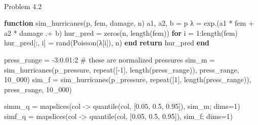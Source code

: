 \documentclass[
  letterpaper,
  DIV=11,
  numbers=noendperiod]{scrartcl}
\makeatletter
\let\oldparagraph\paragraph
\renewcommand{\paragraph}{
    \@ifstar
      \xxxParagraphStar
      \xxxParagraphNoStar
  }
\newcommand{\xxxParagraphStar}[1]{\oldparagraph*{#1}\mbox{}}
\newcommand{\xxxParagraphNoStar}[1]{\oldparagraph{#1}\mbox{}}
\newenvironment{Shaded}{\begin{snugshade}}{\end{snugshade}}
\newcommand{\CommentTok}[1]{\textcolor[rgb]{0.37,0.37,0.37}{#1}}
\newcommand{\ControlFlowTok}[1]{\textcolor[rgb]{0.00,0.23,0.31}{\textbf{#1}}}
\newcommand{\FloatTok}[1]{\textcolor[rgb]{0.68,0.00,0.00}{#1}}
\newcommand{\FunctionTok}[1]{\textcolor[rgb]{0.28,0.35,0.67}{#1}}
\newcommand{\KeywordTok}[1]{\textcolor[rgb]{0.00,0.23,0.31}{\textbf{#1}}}
\newcommand{\NormalTok}[1]{\textcolor[rgb]{0.00,0.23,0.31}{#1}}
\newcommand{\OperatorTok}[1]{\textcolor[rgb]{0.37,0.37,0.37}{#1}}
\newcommand*\circled[1]{\tikz[baseline=(char.base)]{
          \node[shape=circle,draw,inner sep=1pt] (char) {{\scriptsize#1}};}}
\makeatother
\begin{document}
\paragraph{Problem 4.2}\label{problem-4.2}

\label{annotated-cell-26}%
\begin{Shaded}
\begin{Highlighting}[]
\KeywordTok{function} \FunctionTok{sim\_hurricanes}\NormalTok{(p, fem, damage,  n)}
\NormalTok{    a1, a2, b }\OperatorTok{=}\NormalTok{ p}
\NormalTok{    λ }\OperatorTok{=} \FunctionTok{exp}\NormalTok{.(a1 }\OperatorTok{*}\NormalTok{ fem }\OperatorTok{+}\NormalTok{ a2 }\OperatorTok{*}\NormalTok{ damage }\OperatorTok{.+}\NormalTok{ b)}
\NormalTok{    hur\_pred }\OperatorTok{=} \FunctionTok{zeros}\NormalTok{(n, }\FunctionTok{length}\NormalTok{(fem))}
    \ControlFlowTok{for}\NormalTok{ i }\OperatorTok{=} \FloatTok{1}\OperatorTok{:}\FunctionTok{length}\NormalTok{(fem)}
\NormalTok{        hur\_pred[}\OperatorTok{:}\NormalTok{, i] }\OperatorTok{=} \FunctionTok{rand}\NormalTok{(}\FunctionTok{Poisson}\NormalTok{(λ[i]), n)}
    \ControlFlowTok{end}
    \ControlFlowTok{return}\NormalTok{ hur\_pred}
\KeywordTok{end}

\NormalTok{press\_range }\OperatorTok{=} \OperatorTok{{-}}\FloatTok{3}\OperatorTok{:}\FloatTok{0.01}\OperatorTok{:}\FloatTok{2} \CommentTok{\# these are normalized pressures}
\NormalTok{sim\_m }\OperatorTok{=} \FunctionTok{sim\_hurricanes}\NormalTok{(p\_pressure, }\FunctionTok{repeat}\NormalTok{([}\OperatorTok{{-}}\FloatTok{1}\NormalTok{], }\FunctionTok{length}\NormalTok{(press\_range)), press\_range, }\FloatTok{10\_000}\NormalTok{) }\hspace*{\fill}\NormalTok{\circled{1}}
\NormalTok{sim\_f }\OperatorTok{=} \FunctionTok{sim\_hurricanes}\NormalTok{(p\_pressure, }\FunctionTok{repeat}\NormalTok{([}\FloatTok{1}\NormalTok{], }\FunctionTok{length}\NormalTok{(press\_range)), press\_range, }\FloatTok{10\_000}\NormalTok{) }

\NormalTok{simm\_q }\OperatorTok{=} \FunctionTok{mapslices}\NormalTok{(col }\OperatorTok{{-}\textgreater{}} \FunctionTok{quantile}\NormalTok{(col, [}\FloatTok{0.05}\NormalTok{, }\FloatTok{0.5}\NormalTok{, }\FloatTok{0.95}\NormalTok{]), sim\_m; dims}\OperatorTok{=}\FloatTok{1}\NormalTok{)}
\NormalTok{simf\_q }\OperatorTok{=} \FunctionTok{mapslices}\NormalTok{(col }\OperatorTok{{-}\textgreater{}} \FunctionTok{quantile}\NormalTok{(col, [}\FloatTok{0.05}\NormalTok{, }\FloatTok{0.5}\NormalTok{, }\FloatTok{0.95}\NormalTok{]), sim\_f; dims}\OperatorTok{=}\FloatTok{1}\NormalTok{)}


\end{Highlighting}
\end{Shaded}
\end{document}
